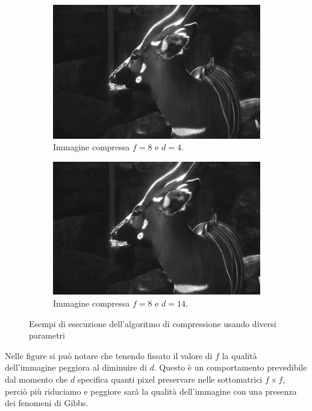 \begin{figure}[!ht]
\begin{subfigure}[!ht]{0.45\textwidth}
        \includegraphics[width=\textwidth]{Progetto_2/img/gui_compressed.png}
        \caption{Immagine compressa $f = 8$ e $d = 4$.}
    \end{subfigure}
    \begin{subfigure}[!ht]{0.45\textwidth}
        \includegraphics[width=\textwidth]{Progetto_2/img/gui_compressed14.png}
        \caption{Immagine compressa $f = 8$ e $d = 14$.}
    \end{subfigure}
    \caption{Esempi di esecuzione dell'algoritmo di compressione usando diversi 
    parametri}
    \label{fig:compress}
\end{figure}

Nelle figure si può notare che tenendo fissato il valore di $f$ la qualità dell'immagine 
peggiora al diminuire di $d$. Questo è un comportamento prevedibile dal momento 
che $d$ specifica quanti pixel preservare nelle sottomatrici $f\times f$, perciò
più riduciamo e peggiore sarà la qualità dell'immagine con una presenza dei fenomeni 
di Gibbs.

